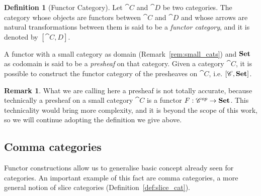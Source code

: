 \documentclass[a4paper, twoside,openright]{report}
\theoremstyle{plain}
\theoremstyle{definition}
\newtheorem{definition}[theorem]{Definition}
\newtheorem{remark}[theorem]{Remark}
\begin{document}
\begin{definition}[Functor Category]\label{def:functor_category}
    Let $\cat C$ and $\cat D$ be two categories. The category whose objects are functors between $\cat C$ and $\cat D$ and whose arrows are natural transformations between them is said to be a \emph{functor category}, and it is denoted by $[\cat{C, D}]$.
\end{definition}

A functor with a small category as domain (Remark~\ref{rem:small_cats}) and $\mathbf{Set}$ as codomain is said to be a \emph{presheaf} on that category. Given a category $\cat C$, it is possible to construct the functor category of the presheaves on $\cat C$, i.e. $[\mathscr{C}, \mathbf{Set}]$.

\begin{remark}
    What we are calling here a presheaf is not totally accurate, because technically a presheaf on a small category $\cat C$ is a functor $F: \mathscr{C} ^{op} \rightarrow \mathbf{Set}$. This technicality would bring more complexity, and it is beyond the scope of this work, so we will continue adopting the definition we give above.
\end{remark}

\subsection{Comma categories}

Functor constructions allow us to generalise basic concept already seen for categories. An important example of this fact are comma categories, a more general notion of slice categories (Definition~\ref{def:slice_cat}).

\end{document}
